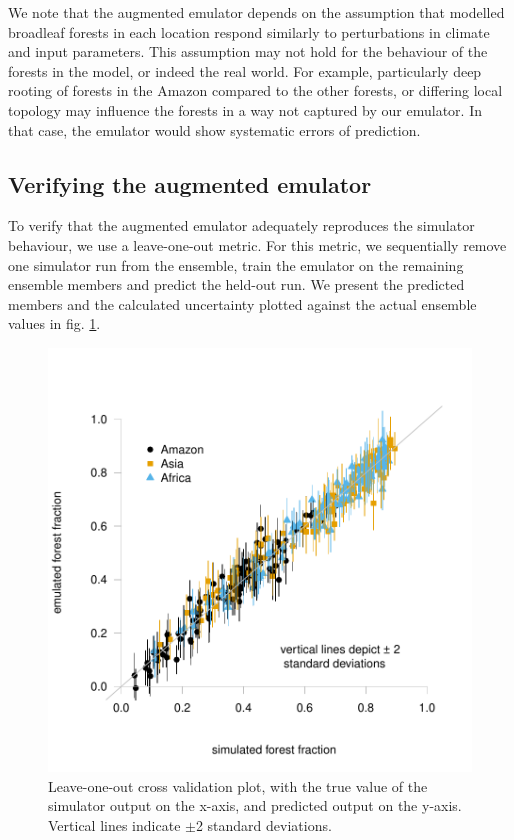 \documentclass[gmd, manuscript]{copernicus}
\begin{document}
We note that the augmented emulator depends on the assumption that modelled broadleaf forests in each location respond similarly to perturbations in climate and input parameters. This assumption may not hold for the behaviour of the forests in the model, or indeed the real world. For example, particularly deep rooting of forests in the Amazon compared to the other forests, or differing local topology may influence the forests in a way not captured by our emulator. In that case, the emulator would show systematic errors of prediction. 

\subsection{Verifying the augmented emulator}\label{ssec:verifying}
To verify that the augmented emulator adequately reproduces the simulator behaviour, we use a leave-one-out metric. For this metric, we sequentially remove one simulator run from the ensemble, train the emulator on the remaining ensemble members and predict the held-out run. We present the predicted members and the calculated uncertainty plotted against the actual ensemble values in fig. \ref{fig:true_loo_all}.

\begin{figure}[t]
\includegraphics[width=12cm]{../graphics/true_loo_all.pdf}
\caption{Leave-one-out cross validation plot, with the true value of the simulator output on the x-axis, and predicted output on the y-axis. Vertical lines indicate $\pm$2 standard deviations.
}
\label{fig:true_loo_all}
\end{figure}
\end{document}

